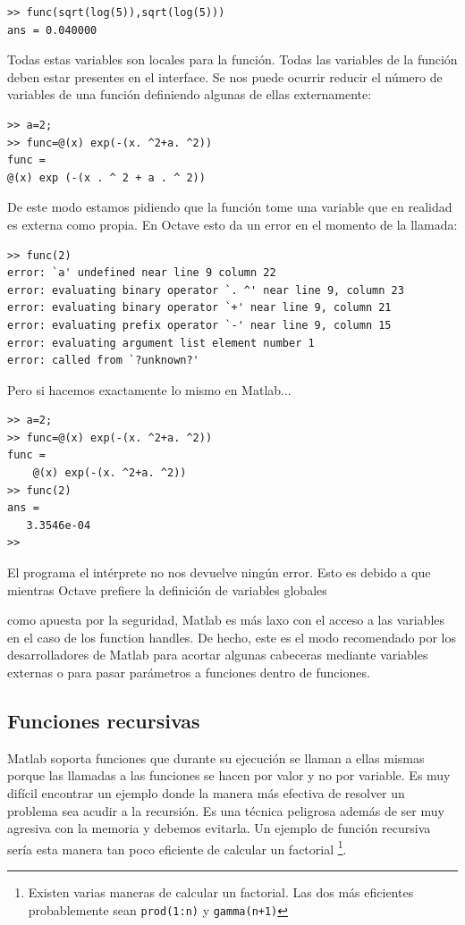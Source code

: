 \begin{verbatim}
>> func(sqrt(log(5)),sqrt(log(5)))
ans = 0.040000 
\end{verbatim}
Todas estas variables son locales para la función. Todas las variables
de la función deben estar presentes en el interface. Se nos puede
ocurrir reducir el número de variables de una función definiendo
algunas de ellas externamente:

\begin{verbatim}
>> a=2;
>> func=@(x) exp(-(x. ^2+a. ^2)) 
func =
@(x) exp (-(x . ^ 2 + a . ^ 2))
\end{verbatim}
De este modo estamos pidiendo que la función tome una variable que en
realidad es externa como propia. En Octave esto da un error en el
momento de la llamada:

\begin{verbatim}
>> func(2)
error: `a' undefined near line 9 column 22
error: evaluating binary operator `. ^' near line 9, column 23
error: evaluating binary operator `+' near line 9, column 21
error: evaluating prefix operator `-' near line 9, column 15
error: evaluating argument list element number 1
error: called from `?unknown?'
\end{verbatim}

Pero si hacemos exactamente lo mismo en Matlab...

\begin{verbatim}
>> a=2;
>> func=@(x) exp(-(x. ^2+a. ^2))
func =
    @(x) exp(-(x. ^2+a. ^2))
>> func(2)
ans =
   3.3546e-04
>>
\end{verbatim}
El programa el intérprete no nos devuelve ningún error. Esto es debido
a que mientras Octave prefiere la definición de variables globales

como apuesta por la seguridad, Matlab es más laxo con el acceso a las
variables en el caso de los function handles. De hecho, este es el
modo recomendado por los desarrolladores de Matlab para acortar
algunas cabeceras mediante variables externas o para pasar parámetros
a funciones dentro de funciones.


\subsection{Funciones recursivas}

Matlab soporta funciones que durante su ejecución se llaman a ellas
mismas porque las llamadas a las funciones se hacen por valor y no por
variable. Es muy difícil encontrar un ejemplo donde la manera más
efectiva de resolver un problema sea acudir a la recursión. Es una
técnica peligrosa además de ser muy agresiva con la memoria y debemos
evitarla. Un ejemplo de función recursiva sería esta manera tan poco
eficiente de calcular un factorial%
\footnote{Existen varias maneras de calcular un factorial. Las dos más
  eficientes probablemente sean \texttt{prod(1:n)} y
  \texttt{gamma(n+1)}%
}.

